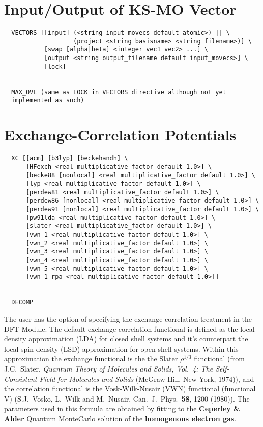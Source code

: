 \section{Input/Output of KS-MO Vector}
\begin{verbatim}
  VECTORS [[input] (<string input_movecs default atomic>) || \
                   (project <string basisname> <string filename>)] \
           [swap [alpha|beta] <integer vec1 vec2> ...] \
           [output <string output_filename default input_movecs>] \
           [lock]


  MAX_OVL (same as LOCK in VECTORS directive although not yet
  implemented as such)
\end{verbatim}

\section{Exchange-Correlation Potentials}
\begin{verbatim}
  XC [[acm] [b3lyp] [beckehandh] \
      [HFexch <real multiplicative_factor default 1.0>] \
      [becke88 [nonlocal] <real multiplicative_factor default 1.0>] \
      [lyp <real multiplicative_factor default 1.0>] \
      [perdew81 <real multiplicative_factor default 1.0>] \
      [perdew86 [nonlocal] <real multiplicative_factor default 1.0>] \
      [perdew91 [nonlocal] <real multiplicative_factor default 1.0>] \
      [pw91lda <real multiplicative_factor default 1.0>] \
      [slater <real multiplicative_factor default 1.0>] \
      [vwn_1 <real multiplicative_factor default 1.0>] \
      [vwn_2 <real multiplicative_factor default 1.0>] \
      [vwn_3 <real multiplicative_factor default 1.0>] \
      [vwn_4 <real multiplicative_factor default 1.0>] \
      [vwn_5 <real multiplicative_factor default 1.0>] \
      [vwn_1_rpa <real multiplicative_factor default 1.0>]]


  DECOMP
\end{verbatim}

The user has the option of specifying the exchange-correlation treatment 
in the DFT Module.  The default exchange-correlation functional is defined
as the local density approximation (LDA) for closed shell systems and it's
counterpart the local spin-density (LSD) approximation for open shell
systems.  Within this approximation the exchange functional is the 
the Slater $\rho^{1/3}$ functional (from J.C.~Slater, 
{\sl Quantum Theory of Molecules and
Solids, Vol.~4: The Self-Consistent Field for Molecules and Solids}
(McGraw-Hill, New York, 1974)), and the correlation
functional is the Vosk-Wilk-Nusair (VWN) functional (functional V)
(S.J.~Vosko, L.~Wilk and M.~Nusair, 
Can.~J.~Phys.~{\bf  58}, 1200 (1980)).  The parameters used in this
formula are obtained by fitting to the {\bf Ceperley \&
Alder\footnotemark[1]} Quantum
MonteCarlo solution of the {\bf homogenous electron gas}.

